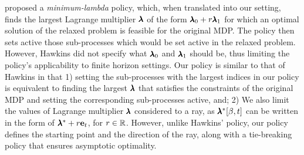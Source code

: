 \begin{remark} \cite{Hawkins2003} proposed a \textit{minimum-lambda} policy, which, when translated into our setting, finds the largest Lagrange multiplier $\pmb{\lambda}$ of the form $\pmb{\lambda}_0+r\pmb{\lambda}_1$ for which an optimal solution of the relaxed problem is feasible for the original MDP. The policy then sets active those sub-processes which would be set active in the relaxed problem. However, Hawkins did not specify what $\pmb{\lambda}_0$ and $\pmb{\lambda}_1$ should be, thus limiting the policy's applicability to finite horizon settings. Our policy is similar to that of Hawkins in that 1) setting the sub-processes with the largest indices in our policy is equivalent to finding the largest $\pmb{\lambda}$ that satisfies the constraints of the original MDP and setting the corresponding sub-processes active, and; 2) We also limit the values of Lagrange multiplier $\pmb{\lambda}$ considered to a ray, as $\pmb{\lambda}^*[\beta,t]$ can be written in the form of $\pmb{\lambda}^* + r\mathbf{e}_t$, for $r\in\mathbb{R}$. However, unlike Hawkins' policy, our policy defines the starting point and the direction of the ray, along with a tie-breaking policy that ensures asymptotic optimality. 
\end{remark}